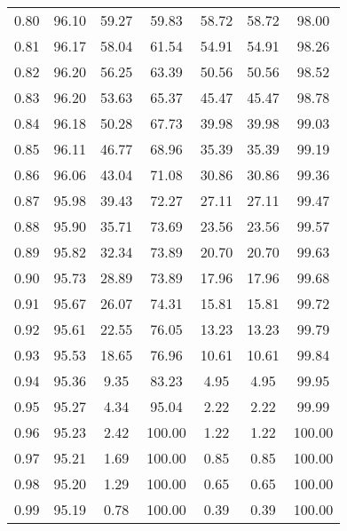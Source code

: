 \begin{tabular}{|c|c|c|c|c|c|c|}
      0.80 &     96.10 &     59.27 &      59.83 &   58.72 &      58.72 &         98.00 \\
      0.81 &     96.17 &     58.04 &      61.54 &   54.91 &      54.91 &         98.26 \\
      0.82 &     96.20 &     56.25 &      63.39 &   50.56 &      50.56 &         98.52 \\
      0.83 &     96.20 &     53.63 &      65.37 &   45.47 &      45.47 &         98.78 \\
      0.84 &     96.18 &     50.28 &      67.73 &   39.98 &      39.98 &         99.03 \\
      0.85 &     96.11 &     46.77 &      68.96 &   35.39 &      35.39 &         99.19 \\
      0.86 &     96.06 &     43.04 &      71.08 &   30.86 &      30.86 &         99.36 \\
      0.87 &     95.98 &     39.43 &      72.27 &   27.11 &      27.11 &         99.47 \\
      0.88 &     95.90 &     35.71 &      73.69 &   23.56 &      23.56 &         99.57 \\
      0.89 &     95.82 &     32.34 &      73.89 &   20.70 &      20.70 &         99.63 \\
      0.90 &     95.73 &     28.89 &      73.89 &   17.96 &      17.96 &         99.68 \\
      0.91 &     95.67 &     26.07 &      74.31 &   15.81 &      15.81 &         99.72 \\
      0.92 &     95.61 &     22.55 &      76.05 &   13.23 &      13.23 &         99.79 \\
      0.93 &     95.53 &     18.65 &      76.96 &   10.61 &      10.61 &         99.84 \\
      0.94 &     95.36 &      9.35 &      83.23 &    4.95 &       4.95 &         99.95 \\
      0.95 &     95.27 &      4.34 &      95.04 &    2.22 &       2.22 &         99.99 \\
      0.96 &     95.23 &      2.42 &     100.00 &    1.22 &       1.22 &        100.00 \\
      0.97 &     95.21 &      1.69 &     100.00 &    0.85 &       0.85 &        100.00 \\
      0.98 &     95.20 &      1.29 &     100.00 &    0.65 &       0.65 &        100.00 \\
      0.99 &     95.19 &      0.78 &     100.00 &    0.39 &       0.39 &        100.00 \\
\bottomrule
\end{tabular}
